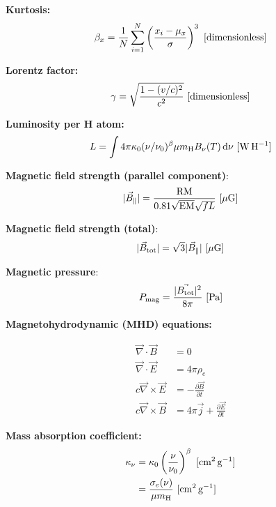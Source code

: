 \documentclass[a4paper,10pt]{article}
\begin{document}
{\noindent}\textbf{Kurtosis:}
\begin{align*}
    \beta_x = \frac{1}{N} \sum_{i=1}^N \left(\frac{x_i-\mu_x}{\sigma}\right)^3 ~ [{\rm dimensionless}]
\end{align*}

{\noindent}\textbf{Lorentz factor:}
\begin{align*}
    \gamma = \sqrt{\frac{1 - (v/c)^2}{c^2}} ~ [{\rm dimensionless}]
\end{align*}

{\noindent}\textbf{Luminosity per H atom:}
\begin{align*}
    L = \int 4\pi\kappa_0(\nu/\nu_0)^\beta \mu m_{\rm H}B_\nu(T) \,{\rm d}\nu ~ [{\rm W\,H^{-1}}]
\end{align*}

{\noindent}\textbf{Magnetic field strength (parallel component)}:
\begin{align*}
    \lvert\vec{B}_\parallel\rvert = \frac{\rm RM}{0.81\sqrt{\rm EM}\sqrt{fL}} ~[{\rm \mu G]}
\end{align*}

{\noindent}\textbf{Magnetic field strength (total)}:
\begin{align*}
    \lvert\vec{B}_{\rm tot}\rvert = \sqrt{3}\lvert\vec{B}_\parallel\rvert ~[{\rm \mu G]}
\end{align*}

{\noindent}\textbf{Magnetic pressure}:
\begin{align*}
    P_{\rm mag} = \frac{\lvert\vec{B_{\rm tot}}\rvert^2}{8\pi}~ [{\rm Pa]}
\end{align*}

{\noindent}\textbf{Magnetohydrodynamic (MHD) equations:}

\begin{align*}
    \vec\nabla\cdot\vec{B} &= 0 \\
    \vec\nabla\cdot\vec{E} &= 4\pi\rho_e \\
    c\vec\nabla\times\vec{E} &= - \frac{\partial\vec{B}}{\partial t} \\
    c\vec\nabla\times\vec{B} &= 4\pi\vec{j} + \frac{\partial\vec{E}}{\partial t}
\end{align*}

{\noindent}\textbf{Mass absorption coefficient:}
\begin{align*}
    \kappa_\nu &= \kappa_0 \left(\frac{\nu}{\nu_0}\right)^\beta ~ [{\rm cm^2\,g^{-1}}] \\
                       &= \frac{\sigma_e(\nu)}{\mu m_{\rm H}} ~ [{\rm cm^2\,g^{-1}}]
\end{align*}
\end{document}
